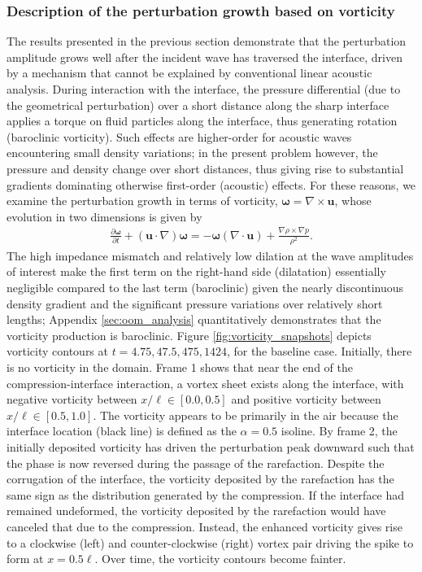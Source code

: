 \subsubsection{Description of the perturbation growth based on vorticity}
\label{subsubsec:vorticity_growth}


The results presented in the previous section demonstrate that the
perturbation amplitude grows well after the incident wave has
traversed the interface, driven by a mechanism that cannot be
explained by conventional linear acoustic analysis.  During
interaction with the interface, the pressure differential (due to the
geometrical perturbation) over a short distance along the sharp
interface applies a torque on fluid particles along the interface,
thus generating rotation (baroclinic vorticity). Such effects are
higher-order for acoustic waves encountering small density variations;
in the present problem however, the pressure and density change over
short distances, thus giving rise to substantial gradients dominating
otherwise first-order (acoustic) effects.  For these reasons, we
examine the perturbation growth in terms of vorticity,
$\boldsymbol{\omega}=\nabla\times\boldsymbol{u}$, whose evolution in
two dimensions is given by
\begin{align} \label{eq:vorticity_euler}
  \frac{\partial \boldsymbol{\omega}}{\partial t}+\left(\boldsymbol{u}\cdot\nabla\right)\boldsymbol{\omega} =%
  - \boldsymbol{\omega}\left(\nabla\cdot\boldsymbol{u}\right) + \frac{\nabla\rho\times\nabla p}{\rho^2}.%
\end{align}
The high impedance mismatch and relatively low dilation at the wave
amplitudes of interest make the first term on the right-hand side
(dilatation) essentially negligible compared to the last term
(baroclinic) given the nearly discontinuous density gradient and the
significant pressure variations over relatively short lengths;
Appendix \ref{sec:oom_analysis} quantitatively demonstrates that the
vorticity production is baroclinic.  Figure
\ref{fig:vorticity_snapshots} depicts vorticity contours at $t = 4.75,
47.5, 475, 1424$, for the baseline case. Initially, there is no
vorticity in the domain. Frame 1 shows that near the end of the
compression-interface interaction, a vortex sheet exists along the
interface, with negative vorticity between $x/\ell\in[0.0,0.5]$ and
positive vorticity between $x/\ell\in[0.5,1.0]$. The vorticity appears
to be primarily in the air because the interface location (black line)
is defined as the $\alpha=0.5$ isoline. By frame 2, the initially
deposited vorticity has driven the perturbation peak downward such
that the phase is now reversed during the passage of the
rarefaction. Despite the corrugation of the interface, the vorticity
deposited by the rarefaction has the same sign as the distribution
generated by the compression. If the interface had remained
undeformed, the vorticity deposited by the rarefaction would have
canceled that due to the compression.  Instead, the enhanced vorticity
gives rise to a clockwise (left) and counter-clockwise (right) vortex
pair driving the spike to form at $x=0.5\ell$. Over time, the
vorticity contours become fainter.




